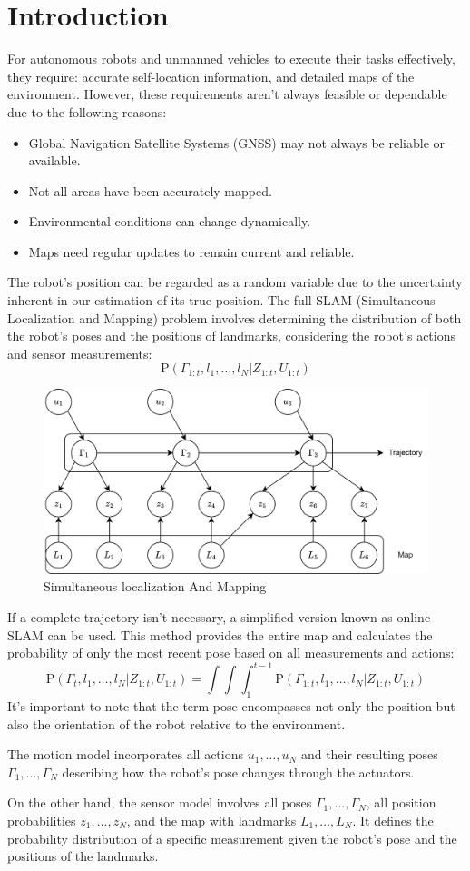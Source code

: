 \section{Introduction}

For autonomous robots and unmanned vehicles to execute their tasks effectively, they require: accurate self-location information, and detailed maps of the environment.
However, these requirements aren't always feasible or dependable due to the following reasons:
\begin{itemize}
    \item Global Navigation Satellite Systems (GNSS) may not always be reliable or available.
    \item Not all areas have been accurately mapped.
    \item Environmental conditions can change dynamically.
    \item Maps need regular updates to remain current and reliable.
\end{itemize}

The robot's position can be regarded as a random variable due to the uncertainty inherent in our estimation of its true position.
The full SLAM (Simultaneous Localization and Mapping) problem involves determining the distribution of both the robot's poses and the positions of landmarks, considering the robot's actions and sensor measurements: 
\[\text{P}\left(\Gamma_{1:t},l_1,\dots,l_N|Z_{1:t},U_{1:t}\right)\]
\begin{figure}[H]
    \centering
    \includegraphics[width=0.75\linewidth]{images/slam.png}
    \caption{Simultaneous localization And Mapping}
\end{figure}
If a complete trajectory isn't necessary, a simplified version known as online SLAM can be used. 
This method provides the entire map and calculates the probability of only the most recent pose based on all measurements and actions: 
\[\text{P}\left(\Gamma_{t},l_1,\dots,l_N|Z_{1:t},U_{1:t}\right)=\int\int\int_{1}^{t-1}\text{P}\left(\Gamma_{1:t},l_1,\dots,l_N|Z_{1:t},U_{1:t}\right)\]
It's important to note that the term pose encompasses not only the position but also the orientation of the robot relative to the environment.

The motion model incorporates all actions $u_1,\dots,u_N$ and their resulting poses $\Gamma_1,\dots,\Gamma_N$ describing how the robot's pose changes through the actuators.

On the other hand, the sensor model involves all poses $\Gamma_1,\dots,\Gamma_N$, all position probabilities $z_1,\dots,z_N$, and the map with landmarks $L_1,\dots,L_N$. 
It defines the probability distribution of a specific measurement given the robot's pose and the positions of the landmarks.